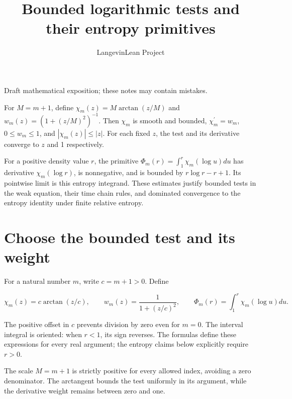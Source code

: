 \documentclass[11pt,a4paper]{article}
\title{\texorpdfstring{Bounded logarithmic tests and their entropy primitives}{Bounded logarithmic tests and their entropy primitives}}
\author{LangevinLean Project}
\date{}
\begin{document}
\maketitle
Draft mathematical exposition; these notes may contain mistakes.


For \(M=m+1\), define \(\chi_m(z)=M\arctan(z/M)\) and \(w_m(z)=(1+(z/M)^2)^{-1}\). Then \(\chi_m\) is smooth and bounded, \(\chi_m^{\prime}=w_m\), \(0\le w_m\le1\), and \(|\chi_m(z)|\le|z|\). For each fixed \(z\), the test and its derivative converge to \(z\) and 1 respectively.



For a positive density value \(r\), the primitive \(\Phi_m(r)=\int_1^r\chi_m(\log u)du\) has derivative \(\chi_m(\log r)\), is nonnegative, and is bounded by \(r\log r-r+1\). Its pointwise limit is this entropy integrand. These estimates justify bounded tests in the weak equation, their time chain rules, and dominated convergence to the entropy identity under finite relative entropy.


\section{\texorpdfstring{Choose the bounded test and its weight}{Choose the bounded test and its weight}}


For a natural number \(m\), write \(c=m+1>0\). Define

\[\chi_m(z)=c\arctan(z/c),\qquad w_m(z)=\frac1{1+(z/c)^2},\qquad\Phi_m(r)=\int_1^r\chi_m(\log u)du.\]

The positive offset in \(c\) prevents division by zero even for \(m=0\). The interval integral is oriented: when \(r<1\), its sign reverses. The formulas define these expressions for every real argument; the entropy claims below explicitly require \(r>0\).



The scale \(M=m+1\) is strictly positive for every allowed index, avoiding a zero denominator. The arctangent bounds the test uniformly in its argument, while the derivative weight remains between zero and one.
\end{document}
